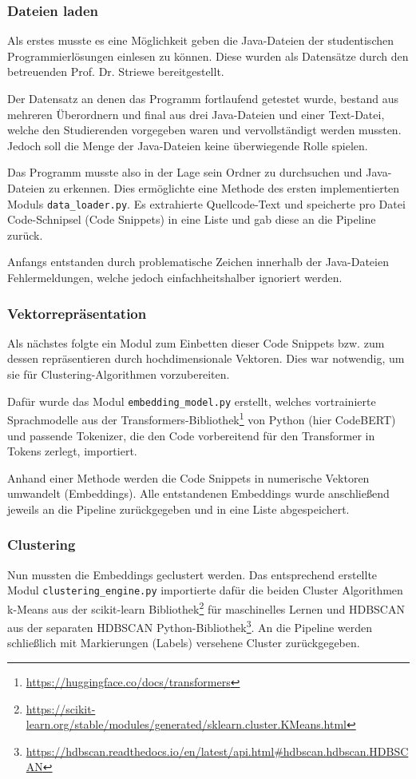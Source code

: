 \subsubsection*{Dateien laden}
Als erstes musste es eine Möglichkeit geben die Java-Dateien der studentischen Programmierlösungen einlesen zu können. Diese wurden als Datensätze durch den betreuenden Prof. Dr. Striewe bereitgestellt.

Der Datensatz an denen das Programm fortlaufend getestet wurde, bestand aus mehreren Überordnern und final aus drei Java-Dateien und einer Text-Datei, welche den Studierenden vorgegeben waren und vervollständigt werden mussten. Jedoch soll die Menge der Java-Dateien keine überwiegende Rolle spielen.

Das Programm musste also in der Lage sein Ordner zu durchsuchen und Java-Dateien zu erkennen. Dies ermöglichte eine Methode des ersten implementierten Moduls \texttt{data\_loader.py}. Es extrahierte Quellcode-Text und speicherte pro Datei Code-Schnipsel (Code Snippets) in eine Liste und gab diese an die Pipeline zurück.

Anfangs entstanden durch problematische Zeichen innerhalb der Java-Dateien Fehlermeldungen, welche jedoch einfachheitshalber ignoriert werden.


\subsubsection*{Vektorrepräsentation}
Als nächstes folgte ein Modul zum Einbetten dieser Code Snippets bzw. zum dessen repräsentieren durch hochdimensionale Vektoren. Dies war notwendig, um sie für Clustering-Algorithmen vorzubereiten. 

Dafür wurde das Modul \texttt{embedding\_model.py} erstellt, welches vortrainierte Sprachmodelle aus der Transformers-Bibliothek\footnote{\url{https://huggingface.co/docs/transformers}} von Python (hier CodeBERT) und passende Tokenizer, die den Code vorbereitend für den Transformer in Tokens zerlegt, importiert.

Anhand einer Methode werden die Code Snippets in numerische Vektoren umwandelt (Embeddings). Alle entstandenen Embeddings wurde anschließend jeweils an die Pipeline zurückgegeben und in eine Liste abgespeichert.


\subsubsection*{Clustering}
Nun mussten die Embeddings geclustert werden. Das entsprechend erstellte Modul \texttt{clustering\_engine.py} importierte dafür die beiden Cluster Algorithmen k-Means aus der scikit-learn Bibliothek\footnote{\url{https://scikit-learn.org/stable/modules/generated/sklearn.cluster.KMeans.html}} für maschinelles Lernen und HDBSCAN aus der separaten HDBSCAN Python-Bibliothek\footnote{\url{https://hdbscan.readthedocs.io/en/latest/api.html\#hdbscan.hdbscan.HDBSCAN}}. An die Pipeline werden schließlich mit Markierungen (Labels) versehene Cluster zurückgegeben.


